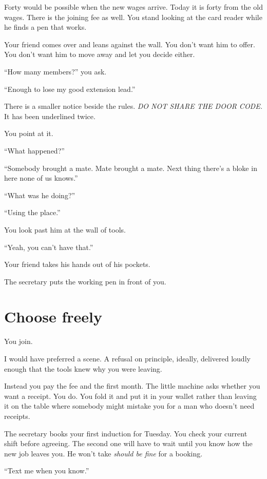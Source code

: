 \documentclass[11pt,oneside]{book}
\begin{document}
Forty would be possible when the new wages arrive. Today it is forty from the old wages. There is the joining fee as well. You stand looking at the card reader while he finds a pen that works.

Your friend comes over and leans against the wall. You don't want him to offer. You don't want him to move away and let you decide either.

``How many members?'' you ask.

``Enough to lose my good extension lead.''

There is a smaller notice beside the rules. \emph{DO NOT SHARE THE DOOR CODE.} It has been underlined twice.

You point at it.

``What happened?''

``Somebody brought a mate. Mate brought a mate. Next thing there's a bloke in here none of us knows.''

``What was he doing?''

``Using the place.''

You look past him at the wall of tools.

``Yeah, you can't have that.''

Your friend takes his hands out of his pockets.

The secretary puts the working pen in front of you.

\section*{Choose freely}

You join.

I would have preferred a scene. A refusal on principle, ideally, delivered loudly enough that the tools knew why you were leaving.

Instead you pay the fee and the first month. The little machine asks whether you want a receipt. You do. You fold it and put it in your wallet rather than leaving it on the table where somebody might mistake you for a man who doesn't need receipts.

The secretary books your first induction for Tuesday. You check your current shift before agreeing. The second one will have to wait until you know how the new job leaves you. He won't take \emph{should be fine} for a booking.

``Text me when you know.''
\end{document}
